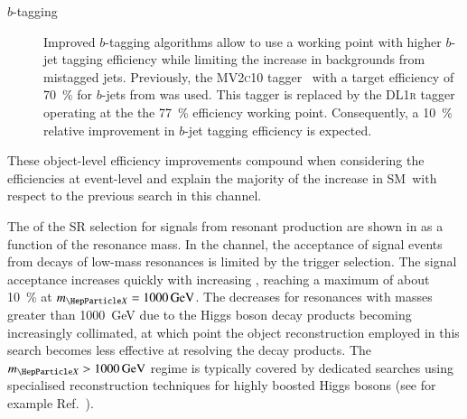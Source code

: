 \begin{description}
\item[$b$-tagging] Improved $b$-tagging algorithms allow to use a working point
  with higher $b$-jet tagging efficiency while limiting the increase in
  backgrounds from mistagged jets. Previously, the \textsc{MV2c10}
  tagger~\cite{ATL-PHYS-PUB-2016-012} with a target efficiency of
  \SI{70}{\percent} for $b$-jets from \ttbar was used. This tagger is replaced
  by the \textsc{DL1r} tagger~\cite{FTAG-2019-07} operating at the the
  \SI{77}{\percent} efficiency working point. Consequently, a \SI{10}{\percent}
  relative improvement in $b$-jet tagging efficiency is expected.


\end{description}
These object-level efficiency improvements compound when considering the
efficiencies at event-level
and explain the majority of the increase in SM~\HH \AccTimesEff with respect to
the previous search in this channel.

The \AccTimesEff of the SR selection for signals from resonant \HH production
are shown in  as a function of the
resonance mass. In the \hadhad channel, the acceptance of signal events from
decays of low-mass resonances is limited by the trigger selection. The signal
acceptance increases quickly with increasing \mX, reaching a maximum of about
\SI{10}{\percent} at $\mX = \SI{1000}{\GeV}$. The \AccTimesEff decreases for
resonances with masses greater than \SI{1000}{\GeV} due to the Higgs boson decay
products becoming increasingly collimated, at which point the object
reconstruction employed in this search becomes less effective at resolving the
decay products. The $\mX > \SI{1000}{\GeV}$ regime is typically covered by
dedicated searches using specialised reconstruction techniques for highly
boosted Higgs bosons (see for example Ref.~\cite{HDBS-2019-22}).

